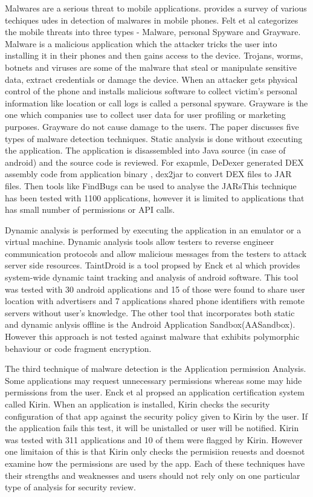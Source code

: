 \documentclass{mproj}
\begin{document}
Malwares are a serious threat to mobile applications. \cite{chandramohan2012} provides a survey of various techiques udes in detection of malwares in mobile phones. Felt et al \cite{felt2011} categorizes the mobile threats into three types - Malware, personal Spyware and Grayware. Malware is a malicious application which the attacker tricks the user into installing it in their phones and then gains access to the device. Trojans, worms, botnets and viruses are some of the malware that steal or manipulate sensitive data, extract credentials or damage the device. When an attacker gets physical control of the phone and installs malicious software to collect victim's personal information like location or call logs is called a personal spyware. Grayware is the one which companies use to collect user data for user profiling or marketing purposes. Grayware do not cause damage to the users. The paper \cite{chandramohan2011} discusses five types of malware detection techniques. Static analysis is done without executing the application. The application is disassembled into Java source (in case of android) and the source code is reviewed.  For exapmle, DeDexer generated DEX assembly code from application binary , dex2jar to convert DEX files to JAR files. Then tools like FindBugs can be used to analyse the JARsThis technique has been tested with 1100 applications, however it is limited to applications that has small number of permissions or API calls. 

Dynamic analysis is performed by executing the application in an emulator or a virtual machine.  Dynamic analysis tools allow testers to reverse engineer communication protocols and allow malicious messages from the testers to attack server side resources.  TaintDroid is a tool propsed by Enck et al\cite{enck2014} which provides system-wide dynamic taint tracking and analysis of android software. This tool was tested with 30 android applications and 15 of those were found to share user location with advertisers and 7 applications shared phone identifiers with remote servers without user's knowledge. The other tool that incorporates both static and dynamic anlysis offline is the Android Application Sandbox(AASandbox)\cite{blasing2010}. However this approach is not tested against malware that exhibits polymorphic behaviour or code fragment encryption. 

The third technique of malware detection is the Application permission Analysis. Some applications may request unnecessary permissions whereas some may hide permissions from the user. Enck et al \cite{enck2009lightweight} propsed an application certification system called Kirin. When an application is installed, Kirin checks the security configuration of that app against the security policy given to Kirin by the user.  If the application fails this test, it will be unistalled or user will be notified. Kirin was tested with 311 applications and 10 of them were flagged by Kirin. However one limitaion of this is that Kirin only checks the permisiion reuests and doesnot examine how the permissions are used by the app. Each of these techniques have their strengths and weaknesses and users should not rely only on one particular type of analysis for security review. 
\end{document}
